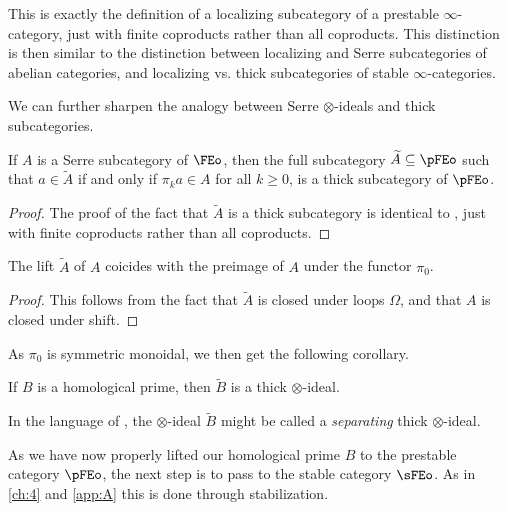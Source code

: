 \begin{remark}
    This is exactly the definition of a localizing subcategory of a prestable $\infty$-category, just with finite coproducts rather than all coproducts. This distinction is then similar to the distinction between localizing and Serre subcategories of abelian categories, and localizing vs. thick subcategories of stable $\infty$-categories. 
\end{remark}

We can further sharpen the analogy between Serre $\otimes$-ideals and thick subcategories. 

\begin{lemma}
    If $A$ is a Serre subcategory of $\FEo$, then the full subcategory $\widetilde{A}\subseteq \pFEo$ such that $a\in \widetilde{A}$ if and only if $\pi_k a \in A$ for all $k\geq 0$, is a thick subcategory of $\pFEo$. 
\end{lemma}
\begin{proof}
    The proof of the fact that $\widetilde{A}$ is a thick subcategory is identical to \cite[C.5.2.7]{lurie_SAG}, just with finite coproducts rather than all coproducts. 
\end{proof}

\begin{lemma}
    \label{lm:pullback-along-pi0}
    The lift $\widetilde{A}$ of $A$ coicides with the preimage of $A$ under the functor $\pi_0$.
\end{lemma}
\begin{proof}
    This follows from the fact that $\widetilde{A}$ is closed under loops $\Omega$, and that $A$ is closed under shift. 
\end{proof}

As $\pi_0$ is symmetric monoidal, we then get the following corollary. 

\begin{corollary}
    If $B$ is a homological prime, then $\widetilde{B}$ is a thick $\otimes$-ideal. 
\end{corollary}

\begin{remark}
    In the language of \cite[App. C]{lurie_SAG}, the $\otimes$-ideal $\widetilde{B}$ might be called a \emph{separating} thick $\otimes$-ideal. 
\end{remark}

As we have now properly lifted our homological prime $B$ to the prestable category $\pFEo$, the next step is to pass to the stable category $\sFEo$. As in \cref{ch:4} and \cref{app:A} this is done through stabilization. 

